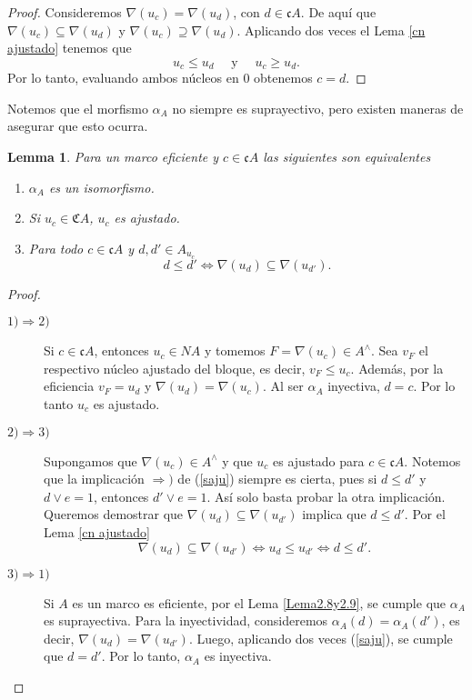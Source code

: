 \documentclass[11pt]{amsart}
\theoremstyle{plain}
\newtheorem{lem}[thm]{Lemma}
\theoremstyle{definition}
\begin{document}
\begin{proof}
    Consideremos $\nabla(u_c)=\nabla(u_d)$, con $d\in \mathfrak{c}A$. De aquí que $\nabla(u_c)\subseteq \nabla(u_d)$ y $\nabla(u_c)\supseteq\nabla(u_d)$. Aplicando dos veces el Lema \ref{cn ajustado} tenemos que 
    \[
    u_c\leq u_d\quad\mbox{ y }\quad u_c\geq u_d.
    \]
    Por lo tanto, evaluando ambos núcleos en $0$ obtenemos $c=d$.
\end{proof}

Notemos que el morfismo $\alpha_A$ no siempre es suprayectivo, pero existen maneras de asegurar que esto ocurra.

\begin{lem}\label{Lema2.7}
    Para un marco eficiente y $c\in \mathfrak{c}A$ las siguientes son equivalentes
    \begin{enumerate}
        \item $\alpha_A$ es un isomorfismo.
        \item Si $u_c\in \mathfrak{C}A$, $u_c$ es ajustado.
        \item Para todo $c\in \mathfrak{c}A$ y $d, d'\in A_{u_c}$
        \begin{equation}\label{saju}
            d\leq d'\Leftrightarrow \nabla(u_d)\subseteq \nabla(u_{d'}).
        \end{equation}
    \end{enumerate}
\end{lem}

\begin{proof}
\begin{description}
        \item[$1)\Rightarrow 2)$] Si $c\in \mathfrak{c}A$, entonces $u_c\in NA$ y tomemos $F=\nabla(u_c)\in A^\wedge$. Sea $v_F$ el respectivo núcleo ajustado del bloque, es decir, $v_F\leq u_c$. Además, por la eficiencia $v_F=u_d$ y  $\nabla(u_d)=\nabla(u_c)$. Al ser $\alpha_A$ inyectiva, $d=c$. Por lo tanto $u_c$ es ajustado. 

        \item[$2)\Rightarrow 3)$] Supongamos que $\nabla(u_c)\in A^\wedge$ y que $u_c$ es ajustado para $c\in \mathfrak{c}A$. Notemos que la implicación $\Rightarrow)$ de (\ref{saju}) siempre es cierta, pues si $d\leq d'$ y $d\vee e=1$, entonces $d'\vee e=1$. Así solo basta probar la otra implicación.\\

        Queremos demostrar que $\nabla(u_d)\subseteq \nabla(u_{d'})$ implica que $d\leq d'$. Por el Lema \ref{cn ajustado}
        \[
        \nabla(u_d)\subseteq \nabla(u_{d'})\Leftrightarrow u_d\leq u_{d'}\Leftrightarrow d\leq d'.
        \]

        \item[$3)\Rightarrow 1)$] Si $A$ es un marco es eficiente, por el Lema \ref{Lema2.8y2.9}, se cumple que $\alpha_A$ es suprayectiva. Para la inyectividad, consideremos $\alpha_A(d)=\alpha_A(d')$, es decir, $\nabla(u_d)=\nabla(u_{d'})$. Luego, aplicando dos veces (\ref{saju}), se cumple que $d=d'$. Por lo tanto, $\alpha_A$ es inyectiva.
    \end{description}
\end{proof}
\end{document}
